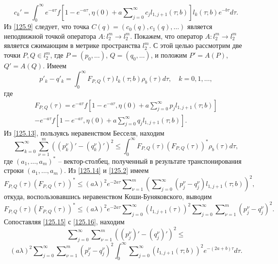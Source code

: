 \begin{equation}\label{125.12}
c_k'=\int_{0}^\infty e^{-a\tau}f\left[1-e^{-a\tau},\eta(0)+ a\sum\nolimits_{j=0}^\infty c_jl_{1,j+1}(\tau;b)\right]l_{k}(\tau;b)e^{-b\tau} d\tau.
\end{equation}
Из  \eqref{125.9} следует, что точка $C(q)=(c_0(q),c_1(q),\ldots)$ является неподвижной точкой оператора $A:l_2^m\to l_2^m$.  Покажем, что оператор $A:l_2^m\to l_2^m$ является сжимающим в метрике пространства $l_2^m$. С этой целью рассмотрим две точки $P,Q\in l_2^m$, где $P=(p_0,\ldots)$, $Q=(q_0,\ldots)$, и положим $P'=A(P)$, $Q'=A(Q)$. Имеем
\begin{equation}\label{125.13}
p'_k-q'_k=\int_{0}^\infty F_{P,Q}(\tau)l_k(\tau;b)\rho_b(\tau)d\tau,\quad k=0,1,\ldots,
\end{equation}
где
\begin{multline}\label{125.14}
F_{P,Q}(\tau)=e^{-a\tau}f\left[1-e^{-a\tau},\eta(0)+ a\sum\nolimits_{j=0}^\infty p_jl_{1,j+1}(\tau;b)\right] \\
-e^{-a\tau}f\left[1-e^{-a\tau},\eta(0)+ a\sum\nolimits_{j=0}^\infty q_jl_{1,j+1}(\tau;b)\right].
\end{multline}
Из \eqref{125.13}, пользуясь неравенством Бесселя, находим
\begin{equation}\label{125.15}
\sum\nolimits_{k=0}^\infty \sum_{\nu=1}^m((p^\nu_k)'-(q^\nu_k)')^2\le\int_{0}^\infty F_{P,Q}(\tau)(F_{P,Q}(\tau))^*\rho_b(\tau) d\tau,
\end{equation}
где $(a_1,\ldots,a_m)^*$ -- вектор-столбец, полученный в результате транспонирования строки $(a_1,\ldots,a_m)$.
Из \eqref{125.14} и \eqref{125.2}  имеем
$$
F_{P,Q}(\tau)(F_{P,Q}(\tau))^*\le (a\lambda)^2e^{-2a\tau} \sum\nolimits_{\nu=1}^m  \left(\sum\nolimits_{j=0}^\infty( p^\nu_j-q^\nu_j)l_{1,j+1}(\tau;b)\right)^2,
$$
откуда,  воспользовавшись неравенством Коши-Буняковского, выводим
\begin{equation}\label{125.16}
F_{P,Q}(\tau)(F_{P,Q}(\tau))^*\le(a\lambda)^2e^{-2a\tau}  \sum\nolimits_{j=0}^\infty(l_{1,j+1}(\tau))^2 \sum\nolimits_{j=0}^\infty\sum\nolimits_{\nu=1}^m( p^\nu_j-q^\nu_j)^2.
\end{equation}
Сопоставляя \eqref{125.15} с \eqref{125.16}, находим
$$
\sum\nolimits_{j=0}^\infty\sum\nolimits_{\nu=1}^m((p^\nu_j)'-(q^\nu_j)')^2\le
$$
\begin{equation}\label{125.17}
(a\lambda)^2 \sum\nolimits_{j=0}^\infty\sum\nolimits_{\nu=1}^m( p^\nu_j-q^\nu_j)^2\int_{0}^\infty \sum\nolimits_{j=0}^\infty(l_{1,j+1}(\tau;b))^2e^{-(2a+b)\tau} d\tau.
\end{equation}
